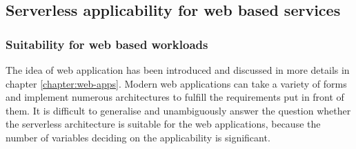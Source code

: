 



\subsection{Serverless applicability for web based services}

\subsubsection{Suitability for web based workloads} \label{chapter:serverless-suitability-for-web-based-workloads}

The idea of web application has been introduced and discussed in more details in chapter \ref{chapter:web-apps}. Modern web applications can take a variety of forms and implement numerous architectures to fulfill the requirements put in front of them.
It is difficult to generalise and unambiguously answer the question whether the serverless architecture is suitable for the web applications, because the number of variables deciding on the applicability is significant.

